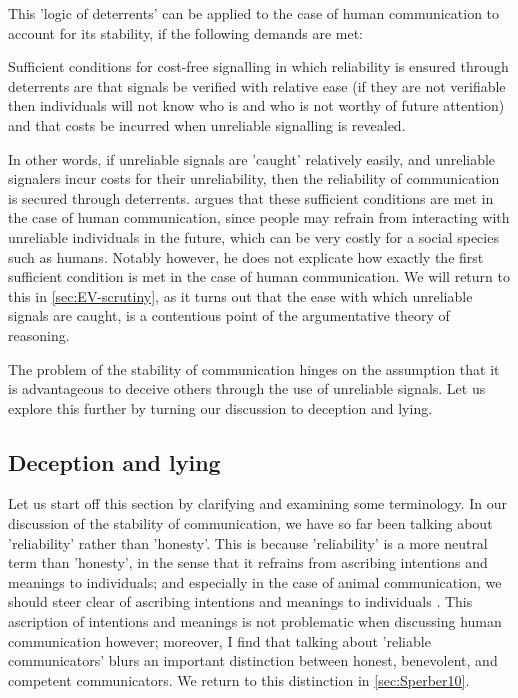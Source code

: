This 'logic of deterrents' can be applied to the case of human communication to account for its stability, if the following demands are met:
\begin{quoting}
    Sufficient conditions for cost-free signalling in which reliability is ensured through deterrents are that signals be verified with relative ease (if they are not verifiable then individuals will not know who is and who is not worthy of future attention) and that costs be incurred when unreliable signalling is revealed.
    \hfill \citep[p.~279]{Scott-Phillips08}
\end{quoting}
In other words, if unreliable signals are 'caught' relatively easily, and unreliable signalers incur costs for their unreliability, then the reliability of communication is secured through deterrents.
\citet{Scott-Phillips08} argues that these sufficient conditions are met in the case of human communication, since people may refrain from interacting with unreliable individuals in the future, which can be very costly for a social species such as humans.
Notably however, he does not explicate how exactly the first sufficient condition is met in the case of human communication. We will return to this in \cref{sec:EV-scrutiny}, as it turns out that the ease with which unreliable signals are caught, is a contentious point of the argumentative theory of reasoning.

The problem of the stability of communication hinges on the assumption that it is advantageous to deceive others through the use of unreliable signals. Let us explore this further by turning our discussion to deception and lying.

\subsection{Deception and lying}
\label{sec:deception}

Let us start off this section by clarifying and examining some terminology.
In our discussion of the stability of communication, we have so far been talking about 'reliability' rather than 'honesty'. This is because 'reliability' is a more neutral term than 'honesty', in the sense that it refrains from ascribing intentions and meanings to individuals; and especially in the case of animal communication, we should steer clear of ascribing intentions and meanings to individuals \citep{Scott-Phillips08}.
This ascription of intentions and meanings is not problematic when discussing human communication however; moreover, I find that talking about 'reliable communicators' blurs an important distinction between honest, benevolent, and competent communicators. We return to this distinction in \cref{sec:Sperber10}.

